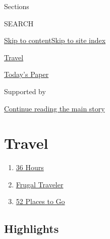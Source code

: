 Sections

SEARCH

\protect\hyperlink{site-content}{Skip to
content}\protect\hyperlink{site-index}{Skip to site index}

\href{https://www.nytimes3xbfgragh.onion/section/travel}{Travel}

\href{https://myaccount.nytimes3xbfgragh.onion/auth/login?response_type=cookie\&client_id=vi}{}

\href{https://www.nytimes3xbfgragh.onion/section/todayspaper}{Today's
Paper}

Supported by

\protect\hyperlink{after-sponsor}{Continue reading the main story}

\hypertarget{travel}{%
\section{Travel}\label{travel}}

\begin{enumerate}
\def\labelenumi{\arabic{enumi}.}
\tightlist
\item
  \href{/column/36-hours}{36 Hours}
\item
  \href{/column/frugal-traveler}{Frugal Traveler}
\item
  \href{/interactive/2020/travel/places-to-visit.html}{52 Places to Go}
\end{enumerate}

\hypertarget{highlights}{%
\subsection{Highlights}\label{highlights}}

